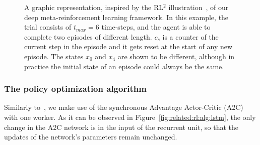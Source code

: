 \begin{figure}[ht]
\begin{center}
\begin{tikzpicture}[scale=0.74, every node/.style={scale=0.74}]
\end{tikzpicture}
\caption{A graphic representation, inspired by the RL$^2$ illustration~\citep{RL2}, of our deep meta-reinforcement learning framework. In this example, the trial consists of $t_{max}=6$ time-steps, and the agent is able to complete two episodes of different length. $c_s$ is a counter of the current step in the episode and it gets reset at the start of any new episode. The states $x_0$ and $x_4$ are shown to be different, although in practice the initial state of an episode could always be the same.}
\label{fig:methodology:rl:formal:diag}
\end{center}
\end{figure}


\subsubsection{The policy optimization algorithm}\label{sec:methodology:rl:poa}

Similarly to~\citet{LtRL}, we make use of the synchronous Advantage Actor-Critic (A2C)~\citep{A2C} with one worker. As it can be observed in Figure~\ref{fig:related:rl:alg:lstm}, the only change in the A2C network is in the input of the recurrent unit, so that the updates of the network's parameters remain unchanged.

